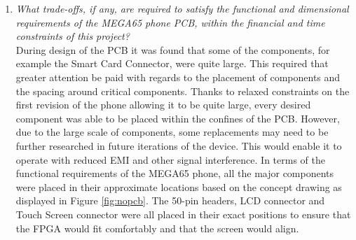 \begin{enumerate}
\item \textit{What trade-offs, if any, are required to satisfy the functional and dimensional requirements of the MEGA65 phone PCB, within the financial and time constraints of this project?}\\

	During design of the PCB it was found that some of the components, for example the Smart Card Connector, were quite large. 
This required that greater attention be paid with regards to the placement of components and the spacing around critical components. 
Thanks to relaxed constraints on the first revision of the phone allowing it to be quite large, every desired component was able to be placed within the confines of the PCB. 
However, due to the large scale of components, some replacements may need to be further researched in future iterations of the device. This would enable it to operate with reduced EMI and other signal interference.
In terms of the functional requirements of the MEGA65 phone, all the major components were placed in their approximate locations based on the concept drawing as displayed in Figure \ref{fig:nopcb}. The 50-pin headers, LCD connector and Touch Screen connector were all placed in their exact positions to ensure that the FPGA would fit comfortably and that the screen would align.\\

\end{enumerate}






